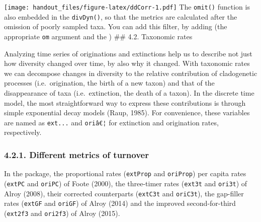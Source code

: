 \documentclass[]{article}
\begin{document}
\texttt{[image: handout\_files/figure-latex/ddCorr-1.pdf]} The
\texttt{omit()} function is also embedded in the \texttt{divDyn()}, so
that the metrics are calculated after the omission of poorly sampled
taxa. You can add this filter, by adding (the appropriate \texttt{om}
argument and the ) \#\# 4.2. Taxonomic rates

Analyzing time series of originations and extinctions help us to
describe not just how diversity changed over time, by also why it
changed. With taxonomic rates we can decompose changes in diversity to
the relative contribution of cladogenetic processes (i.e.~origination,
the birth of a new taxon) and that of the disappearance of taxa
(i.e.~extinction, the death of a taxon). In the discrete time model, the
most straightforward way to express these contributions is through
simple exponential decay models (Raup, 1985). For convenience, these
variables are named as \texttt{ext...} and \texttt{oriâ€¦} for
extinction and origination rates, respectively.

\hypertarget{different-metrics-of-turnover}{%
\subsubsection{4.2.1. Different metrics of
turnover}\label{different-metrics-of-turnover}}

In the package, the proportional rates (\texttt{extProp} and
\texttt{oriProp}) per capita rates (\texttt{extPC} and \texttt{oriPC})
of Foote (2000), the three-timer rates (\texttt{ext3t} and
\texttt{ori3t}) of Alroy (2008), their corrected counterparts
(\texttt{extC3t} and \texttt{oriC3t}), the gap-filler rates
(\texttt{extGF} and \texttt{oriGF}) of Alroy (2014) and the improved
second-for-third (\texttt{ext2f3} and \texttt{ori2f3}) of Alroy (2015).
\end{document}
